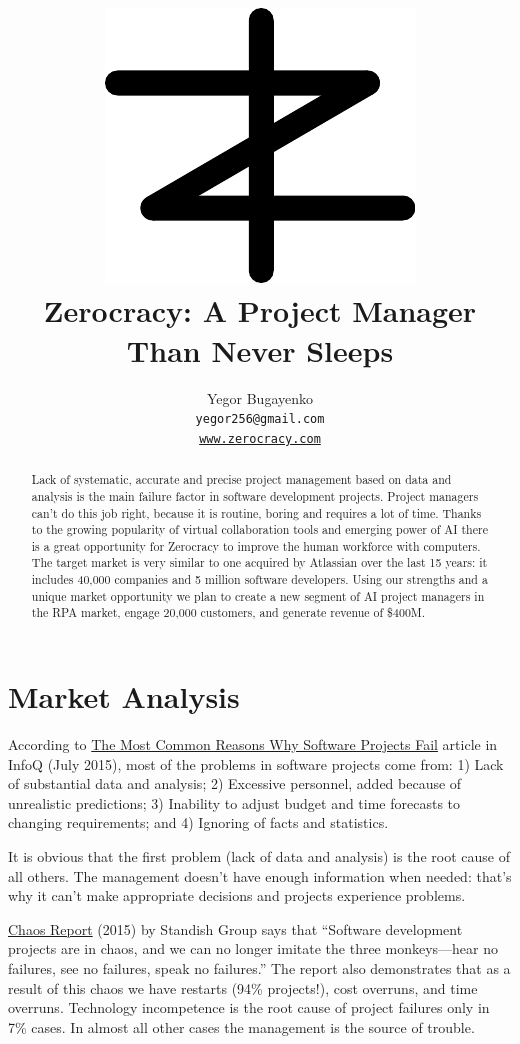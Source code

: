 \documentclass{main}
\title{\includegraphics[scale=0.5]{../images/zerocracy-logo.pdf}\\
  Zerocracy: A Project Manager Than Never Sleeps\\
  {\small\colorbox{blue!20!black}{\color{white}{Executive Summary}}}}
\author{Yegor Bugayenko\\
  \texttt{yegor256@gmail.com}\\
  \href{https://www.zerocracy.com}{\texttt{www.zerocracy.com}}\\[1em]
  \href{https://github.com/zold-io/papers/releases/tag/\zoldversion}{\texttt{\zoldversion}}}
\begin{document}
\maketitle

\begin{abstract}
Lack of systematic, accurate and precise project management based on data and
analysis is the main failure factor in software development projects. Project
managers can't do this job right, because it is routine, boring and requires a
lot of time. Thanks to the growing popularity of virtual collaboration tools and
emerging power of AI there is a great opportunity for Zerocracy to improve the
human workforce with computers. The target market is very similar to one
acquired by Atlassian over the last 15 years: it includes 40,000 companies and 5
million software developers. Using our strengths and a unique market opportunity
we plan to create a new segment of AI project managers in the RPA market, engage
20,000 customers, and generate revenue of \$400M.
\end{abstract}

\section{Market Analysis}

According to
\href{https://www.infoq.com/articles/software-failure-reasons}{The Most Common Reasons Why Software Projects Fail}
article in InfoQ
(July 2015), most of the problems in software projects come from: 1) Lack of
substantial data and analysis; 2) Excessive personnel, added because of
unrealistic predictions; 3) Inability to adjust budget and time forecasts to
changing requirements; and 4) Ignoring of facts and statistics.

It is obvious that the first problem (lack of data and analysis) is the root
cause of all others. The management doesn't have enough information when needed:
that's why it can't make appropriate decisions and projects experience problems.

\href{https://www.projectsmart.co.uk/white-papers/chaos-report.pdf}{Chaos Report} (2015)
by Standish Group says that ``Software development projects
are in chaos, and we can no longer imitate the three monkeys---hear no failures,
see no failures, speak no failures.'' The report also demonstrates that as a
result of this chaos we have restarts (94\% projects!), cost overruns, and time
overruns. Technology incompetence is the root cause of project failures only in
7\% cases. In almost all other cases the management is the source of trouble.
\end{document}
